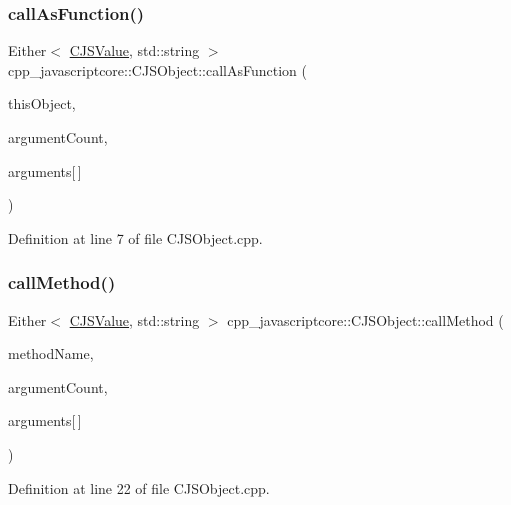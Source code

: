 \subsubsection{\texorpdfstring{call\+As\+Function()}{callAsFunction()}}
{\footnotesize\ttfamily Either$<$ \mbox{\hyperlink{classcpp__javascriptcore_1_1_c_j_s_value}{C\+J\+S\+Value}}, std\+::string $>$ cpp\+\_\+javascriptcore\+::\+C\+J\+S\+Object\+::call\+As\+Function (\begin{DoxyParamCaption}\item[{J\+S\+Object\+Ref}]{this\+Object,  }\item[{size\+\_\+t}]{argument\+Count,  }\item[{const J\+S\+Value\+Ref}]{arguments\mbox{[}$\,$\mbox{]} }\end{DoxyParamCaption})}



Definition at line 7 of file C\+J\+S\+Object.\+cpp.

\mbox{\label{classcpp__javascriptcore_1_1_c_j_s_object_a83d547bf7f937e8736c037c64d1c43d7}} 
\subsubsection{\texorpdfstring{call\+Method()}{callMethod()}}
{\footnotesize\ttfamily Either$<$ \mbox{\hyperlink{classcpp__javascriptcore_1_1_c_j_s_value}{C\+J\+S\+Value}}, std\+::string $>$ cpp\+\_\+javascriptcore\+::\+C\+J\+S\+Object\+::call\+Method (\begin{DoxyParamCaption}\item[{const std\+::string \&}]{method\+Name,  }\item[{size\+\_\+t}]{argument\+Count,  }\item[{const J\+S\+Value\+Ref}]{arguments\mbox{[}$\,$\mbox{]} }\end{DoxyParamCaption})}



Definition at line 22 of file C\+J\+S\+Object.\+cpp.

\mbox{\label{classcpp__javascriptcore_1_1_c_j_s_object_a6f97c34295cb1ee7709f6270fedb1c54}} 
